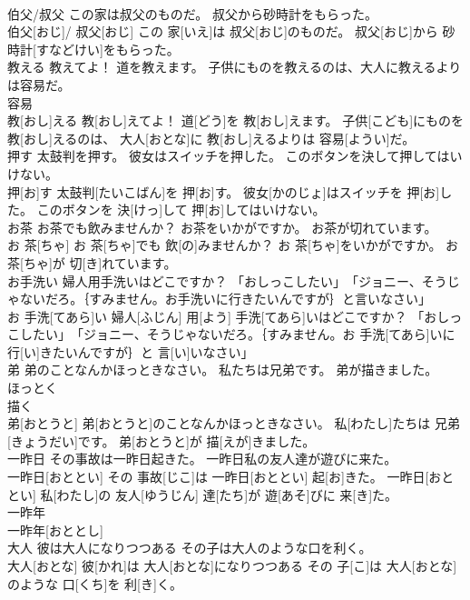 \documentclass[8pt]{extreport}
\begin{document}
\begin{CJK}{UTF8}{min}
\\	伯父/叔父 この家は叔父のものだ。 叔父から砂時計をもらった。	
\\	伯父[おじ]/ 叔父[おじ] この 家[いえ]は 叔父[おじ]のものだ。 叔父[おじ]から 砂時計[すなどけい]をもらった。
\\	教える 教えてよ！ 道を教えます。 子供にものを教えるのは、大人に教えるよりは容易だ。	
\\	容易 
\\	教[おし]える 教[おし]えてよ！ 道[どう]を 教[おし]えます。 子供[こども]にものを 教[おし]えるのは、 大人[おとな]に 教[おし]えるよりは 容易[ようい]だ。
\\	押す 太鼓判を押す。 彼女はスイッチを押した。 このボタンを決して押してはいけない。	
\\	押[お]す 太鼓判[たいこばん]を 押[お]す。 彼女[かのじょ]はスイッチを 押[お]した。 このボタンを 決[けっ]して 押[お]してはいけない。
\\	お茶 お茶でも飲みませんか？ お茶をいかがですか。 お茶が切れています。	
\\	お 茶[ちゃ] お 茶[ちゃ]でも 飲[の]みませんか？ お 茶[ちゃ]をいかがですか。 お 茶[ちゃ]が 切[き]れています。
\\	お手洗い 婦人用手洗いはどこですか？ 「おしっこしたい」　「ジョニー、そうじゃないだろ。｛すみません。お手洗いに行きたいんですが｝と言いなさい」	
\\	お 手洗[てあら]い 婦人[ふじん] 用[よう] 手洗[てあら]いはどこですか？ 「おしっこしたい」　「ジョニー、そうじゃないだろ。｛すみません。お 手洗[てあら]いに 行[い]きたいんですが｝と 言[い]いなさい」
\\	弟 弟のことなんかほっときなさい。 私たちは兄弟です。 弟が描きました。	
\\	ほっとく 
\\	描く 
\\	弟[おとうと] 弟[おとうと]のことなんかほっときなさい。 私[わたし]たちは 兄弟[きょうだい]です。 弟[おとうと]が 描[えが]きました。
\\	一昨日 その事故は一昨日起きた。 一昨日私の友人達が遊びに来た。	
\\	一昨日[おととい] その 事故[じこ]は 一昨日[おととい] 起[お]きた。 一昨日[おととい] 私[わたし]の 友人[ゆうじん] 達[たち]が 遊[あそ]びに 来[き]た。
\\	一昨年	
\\	一昨年[おととし]
\\	大人 彼は大人になりつつある その子は大人のような口を利く。	
\\	大人[おとな] 彼[かれ]は 大人[おとな]になりつつある その 子[こ]は 大人[おとな]のような 口[くち]を 利[き]く。

\end{CJK}
\end{document}
